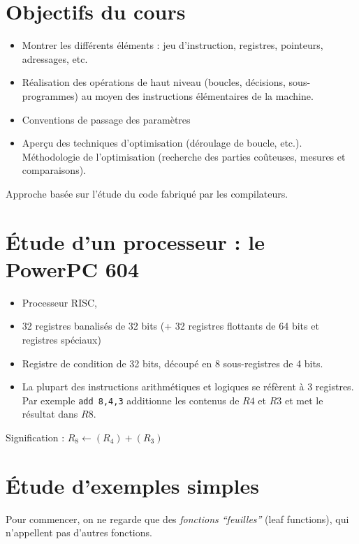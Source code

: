 \documentclass[10pt,twoside,a4paper]{article}
\begin{document}
\begin{multicols}{2}
\tableofcontents

\section{Objectifs du cours}

\begin{itemize}
\item
  Montrer les différents éléments : jeu d'instruction, registres, 
pointeurs, adressages, etc.
\item
  Réalisation des opérations de haut niveau (boucles, décisions,
sous-programmes) au moyen des  instructions
élémentaires de la machine. 
\item
  Conventions de passage des paramètres
\item
  Aperçu des techniques d'optimisation (déroulage de boucle, etc.).
Méthodologie de l'optimisation (recherche des parties coûteuses,
mesures et comparaisons).
\end{itemize}

Approche basée sur l'étude du code fabriqué par les compilateurs.


\section{Étude d'un processeur : le PowerPC 604}


\begin{itemize}
\item
Processeur RISC, 
\item 
32 registres banalisés de 32 bits (+ 32 registres flottants de 64 bits 
et registres spéciaux)
\item
Registre de condition de 32 bits, découpé en 8 sous-registres
de 4 bits.
\item 
La plupart des instructions arithmétiques et logiques se réfèrent 
à 3 registres. Par exemple \texttt{add 8,4,3} additionne les contenus de 
$R4$ et $R3$ et met le résultat dans $R8$.

\end{itemize}
Signification : $ R_8 \leftarrow (R_4) + (R_3)$

\section{Étude d'exemples simples}

Pour commencer, on ne regarde que des \emph{fonctions ``feuilles''} (leaf functions), qui n'appellent
pas d'autres fonctions.



\end{multicols}
\end{document}
